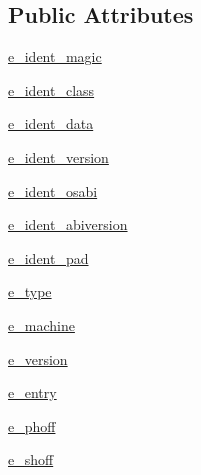 \subsection*{Public Attributes}
\begin{DoxyCompactItemize}
\item 
\hyperlink{classwheel_1_1vendored_1_1packaging_1_1tags_1_1__ELFFileHeader_a63a514a1a42f49ef36b37bb0bfb24aaa}{e\+\_\+ident\+\_\+magic}
\item 
\hyperlink{classwheel_1_1vendored_1_1packaging_1_1tags_1_1__ELFFileHeader_a41bf404ff694e0a68a7fc6547eb544c6}{e\+\_\+ident\+\_\+class}
\item 
\hyperlink{classwheel_1_1vendored_1_1packaging_1_1tags_1_1__ELFFileHeader_aaacec6bec6f02ea2edfde3343d290d5a}{e\+\_\+ident\+\_\+data}
\item 
\hyperlink{classwheel_1_1vendored_1_1packaging_1_1tags_1_1__ELFFileHeader_a55d0fdf6f597c7939e684325c504f083}{e\+\_\+ident\+\_\+version}
\item 
\hyperlink{classwheel_1_1vendored_1_1packaging_1_1tags_1_1__ELFFileHeader_a1f1aee38440457ddad3851184294c6fd}{e\+\_\+ident\+\_\+osabi}
\item 
\hyperlink{classwheel_1_1vendored_1_1packaging_1_1tags_1_1__ELFFileHeader_aa8965d43d39921449d18c880d7fc2807}{e\+\_\+ident\+\_\+abiversion}
\item 
\hyperlink{classwheel_1_1vendored_1_1packaging_1_1tags_1_1__ELFFileHeader_a113c0f229222b5fbb6b9df47e0fd4a43}{e\+\_\+ident\+\_\+pad}
\item 
\hyperlink{classwheel_1_1vendored_1_1packaging_1_1tags_1_1__ELFFileHeader_a478f0809990e2f457d25886ca0499c2b}{e\+\_\+type}
\item 
\hyperlink{classwheel_1_1vendored_1_1packaging_1_1tags_1_1__ELFFileHeader_a13738cf39866a9bc49c644574a82c917}{e\+\_\+machine}
\item 
\hyperlink{classwheel_1_1vendored_1_1packaging_1_1tags_1_1__ELFFileHeader_a344aebd7064e2a7081c960a399328480}{e\+\_\+version}
\item 
\hyperlink{classwheel_1_1vendored_1_1packaging_1_1tags_1_1__ELFFileHeader_aea7e6a7699b6d720af49d08abd9c68e8}{e\+\_\+entry}
\item 
\hyperlink{classwheel_1_1vendored_1_1packaging_1_1tags_1_1__ELFFileHeader_a4c55968427e609b659cc05639a106bf8}{e\+\_\+phoff}
\item 
\hyperlink{classwheel_1_1vendored_1_1packaging_1_1tags_1_1__ELFFileHeader_a0147aad7f00351abe54c623495044af5}{e\+\_\+shoff}
\item 

\end{DoxyCompactItemize}

